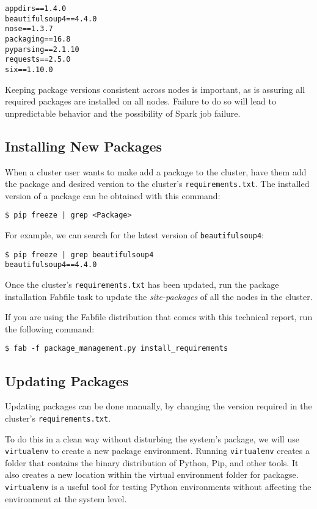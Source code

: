 \documentclass[9pt,twocolumn,twoside]{idsi}
\begin{document}
\begin{verbatim}
appdirs==1.4.0
beautifulsoup4==4.4.0
nose==1.3.7
packaging==16.8
pyparsing==2.1.10
requests==2.5.0
six==1.10.0
\end{verbatim}

Keeping package versions consistent across nodes is important, as is assuring all required packages are installed on all nodes. Failure to do so will lead to unpredictable behavior and the possibility of Spark job failure.

\subsection{Installing New Packages}

When a cluster user wants to make add a package to the cluster, have them add the package and desired version to the cluster's \texttt{requirements.txt}. The installed version of a package can be obtained with this command:
\begin{verbatim}
$ pip freeze | grep <Package>
\end{verbatim}

For example, we can search for the latest version of \texttt{beautifulsoup4}:
\begin{verbatim}
$ pip freeze | grep beautifulsoup4
beautifulsoup4==4.4.0
\end{verbatim}

Once the cluster's \texttt{requirements.txt} has been updated, run the package installation Fabfile task to update the \emph{site-packages} of all the nodes in the cluster.

If you are using the Fabfile distribution that comes with this technical report, run the following command:

\begin{verbatim}
$ fab -f package_management.py install_requirements
\end{verbatim}

\subsection{Updating Packages}
Updating packages can be done manually, by changing the version required in the cluster's \texttt{requirements.txt}.

To do this in a clean way without disturbing the system's package, we will use \texttt{virtualenv} to create a new package environment. Running \texttt{virtualenv} creates a folder that contains the binary distribution of Python, Pip, and other tools. It also creates a new location within the virtual environment folder for packagse. \texttt{virtualenv} is a useful tool for testing Python environments without affecting the environment at the system level.
\end{document}
